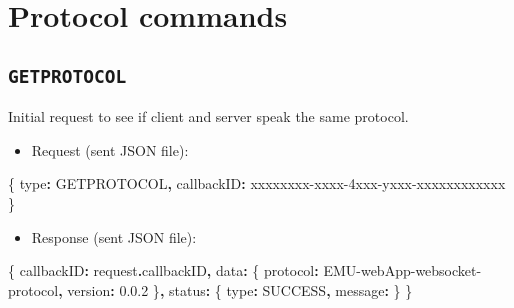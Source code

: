 \documentclass[
]{book}
\newenvironment{Shaded}{\begin{snugshade}}{\end{snugshade}}
\newcommand{\AttributeTok}[1]{\textcolor[rgb]{0.77,0.63,0.00}{#1}}
\newcommand{\NormalTok}[1]{#1}
\newcommand{\OperatorTok}[1]{\textcolor[rgb]{0.81,0.36,0.00}{\textbf{#1}}}
\newcommand{\StringTok}[1]{\textcolor[rgb]{0.31,0.60,0.02}{#1}}
\providecommand{\tightlist}{%
  \setlength{\itemsep}{0pt}\setlength{\parskip}{0pt}}
\begin{document}
\hypertarget{protocol-commands}{%
\section{Protocol commands}\label{protocol-commands}}

\hypertarget{getprotocol}{%
\subsection{\texorpdfstring{\texttt{GETPROTOCOL}}{GETPROTOCOL}}\label{getprotocol}}

Initial request to see if client and server speak the same protocol.

\begin{itemize}
\tightlist
\item
  Request (sent JSON file):
\end{itemize}

\begin{Shaded}
\begin{Highlighting}[]
\NormalTok{\{}
  \StringTok{\textquotesingle{}type\textquotesingle{}}\OperatorTok{:} \StringTok{\textquotesingle{}GETPROTOCOL\textquotesingle{}}\OperatorTok{,}
  \StringTok{\textquotesingle{}callbackID\textquotesingle{}}\OperatorTok{:} \StringTok{\textquotesingle{}xxxxxxxx{-}xxxx{-}4xxx{-}yxxx{-}xxxxxxxxxxxx\textquotesingle{}}
\NormalTok{\}}
\end{Highlighting}
\end{Shaded}

\begin{itemize}
\tightlist
\item
  Response (sent JSON file):
\end{itemize}

\begin{Shaded}
\begin{Highlighting}[]
\NormalTok{\{}
  \StringTok{\textquotesingle{}callbackID\textquotesingle{}}\OperatorTok{:}\NormalTok{ request}\OperatorTok{.}\AttributeTok{callbackID}\OperatorTok{,}
  \StringTok{\textquotesingle{}data\textquotesingle{}}\OperatorTok{:}\NormalTok{ \{}
    \StringTok{\textquotesingle{}protocol\textquotesingle{}}\OperatorTok{:} \StringTok{\textquotesingle{}EMU{-}webApp{-}websocket{-}protocol\textquotesingle{}}\OperatorTok{,}
    \StringTok{\textquotesingle{}version\textquotesingle{}}\OperatorTok{:} \StringTok{\textquotesingle{}0.0.2\textquotesingle{}}
\NormalTok{  \}}\OperatorTok{,}
  \StringTok{\textquotesingle{}status\textquotesingle{}}\OperatorTok{:}\NormalTok{ \{}
    \StringTok{\textquotesingle{}type\textquotesingle{}}\OperatorTok{:} \StringTok{\textquotesingle{}SUCCESS\textquotesingle{}}\OperatorTok{,}
    \StringTok{\textquotesingle{}message\textquotesingle{}}\OperatorTok{:} \StringTok{\textquotesingle{}\textquotesingle{}}
\NormalTok{  \}}
\NormalTok{\}}
\end{Highlighting}
\end{Shaded}
\end{document}
